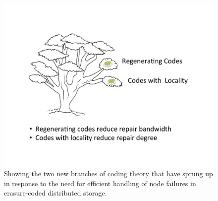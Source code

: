 		\begin{figure}[!h]
			\centering
			\includegraphics[scale=.5]{src/Figures/chap4/oak_2}  
			\caption{Showing the two new branches of coding theory that have sprung up in response to the need for efficient handling of node failures in erasure-coded distributed storage.}  \label{fig:oak_2}    
		\end{figure}


 \newpage

